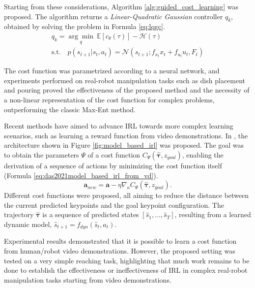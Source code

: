 Starting from these considerations, Algorithm \ref{alg:guided_cost_learning} was proposed. The algorithm returns a \textit{Linear-Quadratic Gaussian} \cite{levine2014lqr_flm} controller $q_{k}$, obtained by solving the problem in Formula \ref{eq:lqgc}.
\begin{equation}
    \label{eq:lqgc}
    \begin{aligned}
    q_{k} = \underset{q}{\arg \min} \ \mathbb{E}[c_{\theta}(\tau)] - \mathcal{H}(\tau) \quad \\ \text{s.t.} \quad p(s_{t+1}|s_{t},a_{t}) = \mathcal{N}(s_{t+1}; f_{x_t}x_{t}+f_{u_t}u_{t}, F_{t})
    \end{aligned}
\end{equation}

The cost function was parametrized according to a neural network, and experiments performed on real-robot manipulation tasks such as dish placement and pouring proved the effectiveness of the proposed method and the necessity of a non-linear representation of the cost function for complex problems, outperforming the classic Max-Ent method.

Recent methods have aimed to advance IRL towards more complex learning scenarios, such as learning a reward function from video demonstrations. In \cite{das2021model_based_irl_from_vd}, the architecture shown in Figure \ref{fig:model_based_irl} was proposed. The goal was to obtain the parameters $\Psi$ of a cost function $C_{\Psi}(\hat{\boldsymbol{\tau}}, z_{goal})$, enabling the derivation of a sequence of actions by minimizing the cost function itself (Formula \ref{eq:das2021model_based_irl_from_vd}).
\begin{equation}
\label{eq:das2021model_based_irl_from_vd}
\textbf{a}_{new} = \textbf{a} - \eta \nabla_{a} C_{\Psi}(\hat{\boldsymbol{\tau}}, z_{goal}).
\end{equation}
Different cost functions were proposed, all aiming to reduce the distance between the current predicted keypoints and the goal keypoint configuration. The trajectory $\hat{\boldsymbol{\tau}}$ is a sequence of predicted states $[\hat{s}_{1}, \dots, \hat{s}_{T}]$, resulting from a learned dynamic model, $\hat{s}_{t+1} = f_{dyn}(\hat{s}_{t}, a_{t})$. 

Experimental results demonstrated that it is possible to learn a cost function from human/robot video demonstrations. However, the proposed setting was tested on a very simple reaching task, highlighting that much work remains to be done to establish the effectiveness or ineffectiveness of IRL in complex real-robot manipulation tasks starting from video demonstrations.

